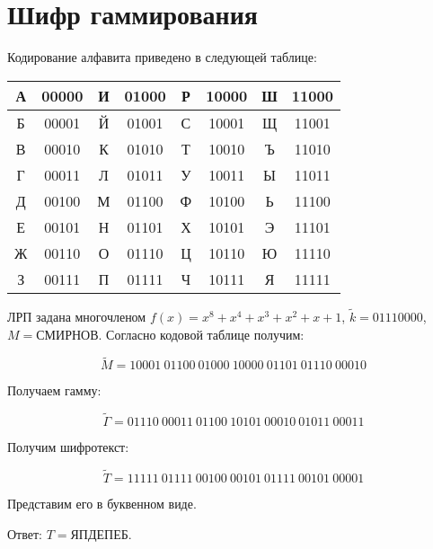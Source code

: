 \section{Шифр гаммирования}

Кодирование алфавита приведено в следующей таблице:
\medskip

{\centering
\begin{tabular}{||c|c||c|c||c|c||c|c||}
\hline
А & 00000 & И & 01000 & Р & 10000 & Ш & 11000 \\
\hline
Б & 00001 & Й & 01001 & С & 10001 & Щ & 11001 \\
\hline
В & 00010 & К & 01010 & Т & 10010 & Ъ & 11010 \\
\hline
Г & 00011 & Л & 01011 & У & 10011 & Ы & 11011 \\
\hline
Д & 00100 & М & 01100 & Ф & 10100 & Ь & 11100 \\
\hline
Е & 00101 & Н & 01101 & Х & 10101 & Э & 11101 \\
\hline
Ж & 00110 & О & 01110 & Ц & 10110 & Ю & 11110 \\
\hline
З & 00111 & П & 01111 & Ч & 10111 & Я & 11111 \\
\hline
\end{tabular}

}

\medskip

ЛРП задана многочленом $f(x) = x^8 + x^4 + x^3 + x^2 + x + 1$, $\widetilde k = 01110000$, $M = СМИРНОВ$. Согласно кодовой таблице получим:

$$\widetilde M = 10001\ 01100\ 01000\ 10000\ 01101\ 01110\ 00010$$

Получаем гамму:

$$\widetilde \Gamma = 01110\ 00011\ 01100\ 10101\ 00010\ 01011\ 00011$$

Получим шифротекст:

$$\widetilde T = 11111\ 01111\ 00100\ 00101\ 01111\ 00101\ 00001$$

Представим его в буквенном виде.

Ответ: $T = ЯПДЕПЕБ$.